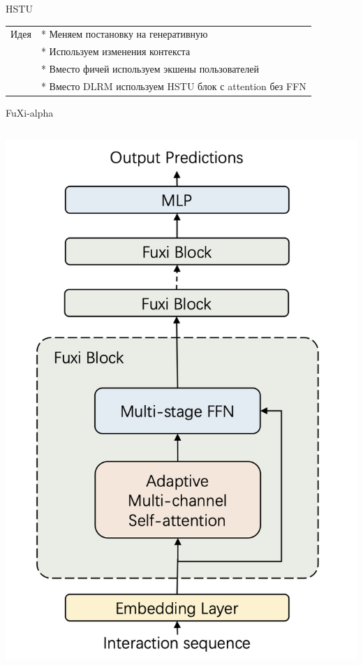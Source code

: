 \documentclass[11pt,aspectratio=169,handout]{beamer}
\begin{document}
\begin{frame}{HSTU \cite{zhai2024actions}}
\vfill
\begin{small}
\begin{tabular}{l l}
Идея & * Меняем постановку на генеративную\\
& * Используем изменения контекста\\
& * Вместо фичей используем экшены пользователей\\
& * Вместо DLRM используем HSTU блок с attention без FFN
\end{tabular}
\end{small}
\end{frame}


\begin{frame}{FuXi-alpha \cite{ye2025fuxi}}

\begin{columns}
\begin{column}{0.5\textwidth} 
\begin{center}
\includegraphics[scale=0.25]{images/fuxi-alpha-arch.png}
\end{center}
\end{column}


\end{columns}
\end{frame}
\end{document}
